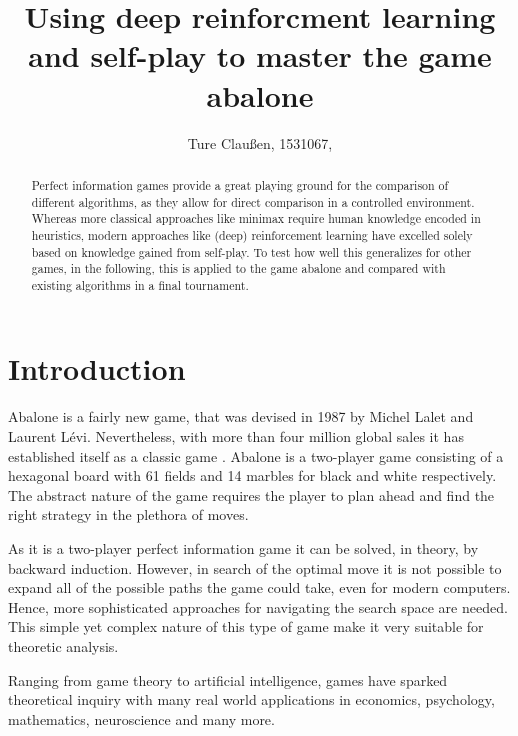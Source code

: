 \documentclass{../lib/llncs}
\begin{document}
\title{Using deep reinforcment learning and self-play to master the game abalone}
\author{Ture Claußen, 1531067, }

{\def\addcontentsline#1#2#3{}\maketitle} %

\begin{abstract}
  Perfect information games provide a great playing ground for the comparison of different algorithms, as they allow for direct comparison in a controlled environment. Whereas more classical approaches like minimax require human knowledge encoded in heuristics, modern approaches like (deep) reinforcement learning have excelled solely based on knowledge gained from self-play. To test how well this generalizes for other games, in the following, this is applied to the game abalone and compared with existing algorithms in a final tournament.
\end{abstract}


\section{Introduction}
Abalone is a fairly new game, that was devised in 1987 by Michel Lalet and Laurent Lévi. Nevertheless, with more than four million global sales it has established itself as a classic game \cite{noauthor_abalone_2020}. Abalone is a two-player game consisting of a hexagonal board with 61 fields and 14 marbles for black and white respectively. The abstract nature of the game requires the player to plan ahead and find the right strategy in the plethora of moves.

As it is a two-player perfect information game it can be solved, in theory, by backward induction. However, in search of the optimal move it is not possible to expand all of the possible paths the game could take, even for modern computers. Hence, more sophisticated approaches for navigating the search space are needed. This simple yet complex nature of this type of game make it very suitable for theoretic analysis. \cite[p. 1]{demichelis_simple_2004}

Ranging from game theory to artificial intelligence, games have sparked theoretical inquiry with many real world applications in economics, psychology, mathematics, neuroscience and many more. \cite[pp. 46]{russell_artificial_2021}
\end{document}
